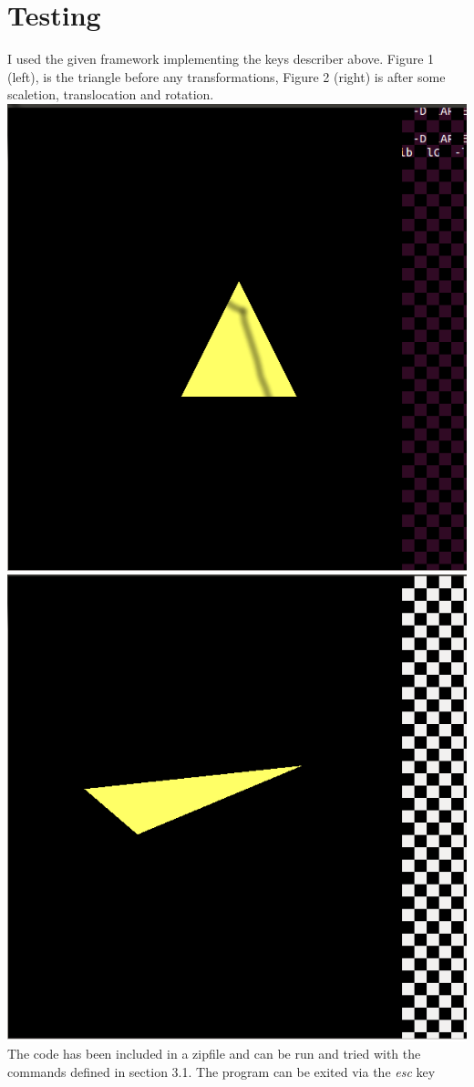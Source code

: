 \documentclass{article}
\begin{document}
\section{Testing}
I used the given framework implementing the keys describer above. 
Figure 1 (left), is the triangle before any transformations, Figure 2 (right)
is after some scaletion, translocation and rotation.\\

\includegraphics[scale=0.2]{penis1.png}
\includegraphics[scale=0.2]{penis2.png}\\
The code has been included in a zipfile and can be run and tried with the commands
defined in section 3.1. The program can be exited via the \emph{esc} key
\end{document}
